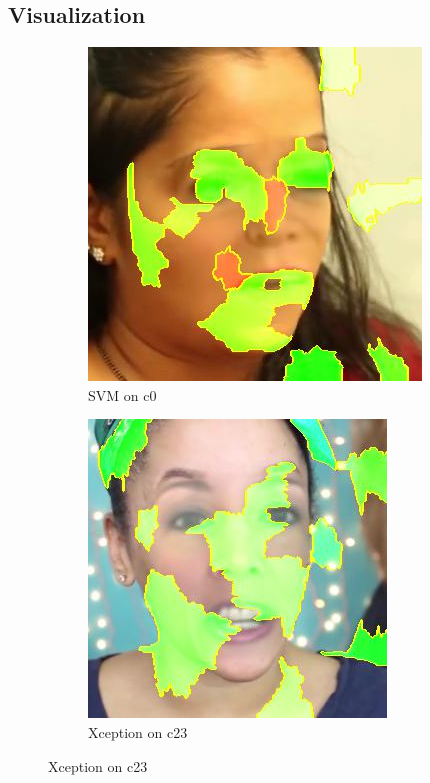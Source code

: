 \documentclass[11pt]{article}
\begin{document}
\subsection{Visualization}
\begin{figure}
    \centering
    \begin{subfigure}[b]{0.2\textwidth}
        \includegraphics[width=\textwidth]{figures/SVM_c0_fake.jpg}
        \caption{SVM on c0}
        \label{fig:svm-c0}
    \end{subfigure}
    \begin{subfigure}[b]{0.2\textwidth}
        \includegraphics[width=\textwidth]{figures/xception_c23_fake.jpg}
        \caption{Xception on c23}
        \label{fig:xception-c23}
    \end{subfigure}
    

\end{figure}
\end{document}
